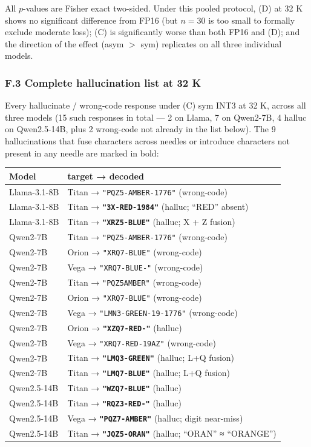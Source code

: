 All \(p\)-values are Fisher exact two-sided. Under this pooled protocol,
(D) at 32 K shows no significant difference from FP16 (but \(n = 30\) is
too small to formally exclude moderate loss); (C) is significantly worse
than both FP16 and (D); and the direction of the effect (asym \(>\) sym)
replicates on all three individual models.

\subsubsection{F.3 Complete hallucination list at 32
K}\label{f.3-complete-hallucination-list-at-32-k}

Every hallucinate / wrong-code response under (C) sym INT3 at 32 K,
across all three models (15 such responses in total --- 2 on Llama, 7 on
Qwen2-7B, 4 halluc on Qwen2.5-14B, plus 2 wrong-code not already in the
list below). The 9 hallucinations that fuse characters across needles or
introduce characters not present in any needle are marked in bold:

{\def\LTcaptype{none} %
\begin{longtable}[]{@{}ll@{}}
\toprule\noalign{}
Model & target → decoded \\
\midrule\noalign{}
\endhead
\bottomrule\noalign{}
\endlastfoot
Llama-3.1-8B & Titan → \texttt{"PQZ5-AMBER-1776"} (wrong-code) \\
Llama-3.1-8B & Titan → \textbf{\texttt{"3X-RED-1984"}} (halluc; ``RED''
absent) \\
Llama-3.1-8B & Titan → \textbf{\texttt{"XRZ5-BLUE"}} (halluc; X + Z
fusion) \\
Qwen2-7B & Titan → \texttt{"PQZ5-AMBER-1776"} (wrong-code) \\
Qwen2-7B & Orion → \texttt{"XRQ7-BLUE"} (wrong-code) \\
Qwen2-7B & Vega → \texttt{"XRQ7-BLUE-"} (wrong-code) \\
Qwen2-7B & Titan → \texttt{"PQZ5AMBER"} (wrong-code) \\
Qwen2-7B & Orion → \texttt{"XRQ7-BLUE"} (wrong-code) \\
Qwen2-7B & Vega → \texttt{"LMN3-GREEN-19-1776"} (wrong-code) \\
Qwen2-7B & Orion → \textbf{\texttt{"XZQ7-RED-"}} (halluc) \\
Qwen2-7B & Vega → \texttt{"XRQ7-RED-19AZ"} (wrong-code) \\
Qwen2-7B & Titan → \textbf{\texttt{"LMQ3-GREEN"}} (halluc; L+Q
fusion) \\
Qwen2-7B & Titan → \textbf{\texttt{"LMQ7-BLUE"}} (halluc; L+Q fusion) \\
Qwen2.5-14B & Titan → \textbf{\texttt{"WZQ7-BLUE"}} (halluc) \\
Qwen2.5-14B & Titan → \textbf{\texttt{"RQZ3-RED-"}} (halluc) \\
Qwen2.5-14B & Vega → \textbf{\texttt{"PQZ7-AMBER"}} (halluc; digit
near-miss) \\
Qwen2.5-14B & Titan → \textbf{\texttt{"JQZ5-ORAN"}} (halluc; ``ORAN'' ≈
``ORANGE'') \\
\end{longtable}
}

